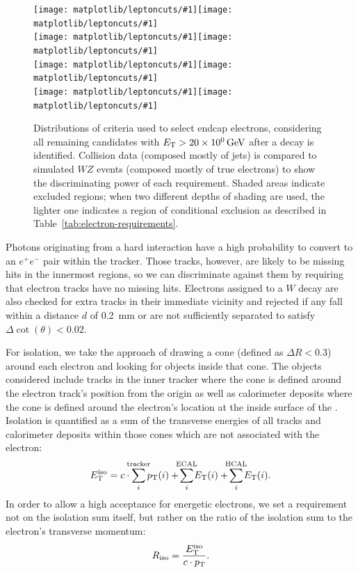 \begin{figure}[p]
  \centering
  \newcommand{\mywidth}{0.47\textwidth}
  \newcommand{\mygraph}[1]{\texttt{[image: matplotlib/leptoncuts/\#1]}}
  \mygraph{scale100/he_pt}\hfill\mygraph{scale10/he_iso}\\
  \mygraph{scale100/he_detain}\hfill\mygraph{scale100/he_dphiin}\\
  \mygraph{scale100/he_nmiss}\hfill\mygraph{scale100/he_sieie}\\
  \mygraph{scale100/he_dist}\hfill\mygraph{scale100/he_dcot}\\
  \caption[Distributions of criteria used to select endcap electrons]{Distributions of criteria used to select endcap electrons, considering all remaining candidates with $\et > \sienergy{20}$ after a \ztoll{} decay is identified.  Collision data (composed mostly of jets) is compared to simulated $WZ$ events (composed mostly of true electrons) to show the discriminating power of each requirement.  Shaded areas indicate excluded regions; when two different depths of shading are used, the lighter one indicates a region of conditional exclusion as described in Table~\ref{tab:electron-requirements}.}
  \label{fig:electron-cuts-he}
\end{figure}

Photons originating from a hard interaction have a high probability to convert to an $e^+e^-$ pair within the tracker.  Those tracks, however, are likely to be missing hits in the innermost regions, so we can discriminate against them by requiring that electron tracks have no missing hits.  Electrons assigned to a $W$ decay are also checked for extra tracks in their immediate vicinity and rejected if any fall within a distance $d$ of \SI{0.2}{mm} or are not sufficiently separated to satisfy $\Delta\cot(\theta) < 0.02$.

For isolation, we take the approach of drawing a cone (defined as $\Delta R < 0.3$) around each electron and looking for objects inside that cone.  The objects considered include tracks in the inner tracker where the cone is defined around the electron track's position from the origin as well as calorimeter deposits where the cone is defined around the electron's location at the inside surface of the \ecal.  Isolation is quantified as a sum of the transverse energies of all tracks and calorimeter deposits within those cones which are not associated with the electron:
\begin{equation}
  \label{eq:isolation}
  \et^\text{iso} = c \cdot \!\!\!\sum_i^\text{tracker}\!\!\! \pt(i) + \!\!\!\sum_i^\text{ECAL}\!\!\! \et(i) + \!\!\!\sum_i^\text{HCAL}\!\!\! \et(i).
\end{equation}
In order to allow a high acceptance for energetic electrons, we set a requirement not on the isolation sum itself, but rather on the ratio of the isolation sum to the electron's transverse momentum:
\begin{equation}
  \label{eq:riso}
  R_\text{iso} = \frac{E_{\mathrm{T}}^\text{iso}}{c \cdot p_{\mathrm{T}}}.
\end{equation}

